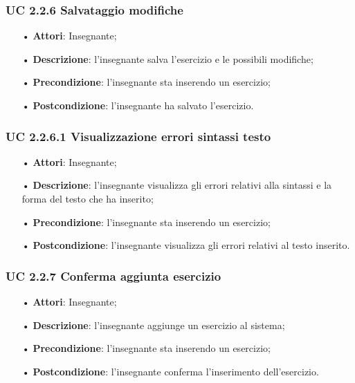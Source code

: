 \subsubsection{UC 2.2.6 Salvataggio modifiche}
\begin{itemize}
	\item[•] \textbf{Attori}: Insegnante;
	\item[•] \textbf{Descrizione}: l'insegnante salva l'esercizio e le possibili modifiche;
	\item[•] \textbf{Precondizione}: l'insegnante sta inserendo un esercizio;
	\item[•] \textbf{Postcondizione}: l'insegnante ha salvato l'esercizio.
\end{itemize}
\subsubsection{UC 2.2.6.1 Visualizzazione errori sintassi testo}
\begin{itemize}
	\item[•] \textbf{Attori}: Insegnante;
	\item[•] \textbf{Descrizione}: l'insegnante visualizza gli errori relativi alla sintassi e la forma del testo che ha inserito;
	\item[•] \textbf{Precondizione}: l'insegnante sta inserendo un esercizio;
	\item[•] \textbf{Postcondizione}: l’insegnante visualizza gli errori relativi al testo inserito.
\end{itemize}

\subsubsection{UC 2.2.7 Conferma aggiunta esercizio}
\begin{itemize}
	\item[•] \textbf{Attori}: Insegnante;
	\item[•] \textbf{Descrizione}: l'insegnante aggiunge un esercizio al sistema;
	\item[•] \textbf{Precondizione}: l’insegnante sta inserendo un esercizio;
	\item[•] \textbf{Postcondizione}: l'insegnante conferma l'inserimento dell'esercizio.
\end{itemize}






